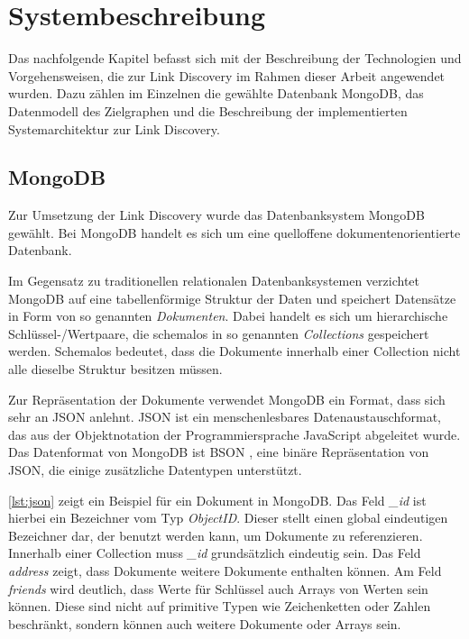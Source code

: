 \chapter{Systembeschreibung}
\label{system}

Das nachfolgende Kapitel befasst sich mit der Beschreibung der Technologien und Vorgehensweisen, die zur Link Discovery im Rahmen dieser Arbeit angewendet wurden. Dazu zählen im Einzelnen die gewählte Datenbank MongoDB, das Datenmodell des Zielgraphen und die Beschreibung der implementierten Systemarchitektur zur Link Discovery.

\section{MongoDB}
\label{mongo}

Zur Umsetzung der Link Discovery wurde das Datenbanksystem MongoDB \cite{mo2013} gewählt. Bei MongoDB handelt es sich um eine quelloffene dokumentenorientierte Datenbank.

Im Gegensatz zu traditionellen relationalen Datenbanksystemen verzichtet MongoDB auf eine tabellenförmige Struktur der Daten und speichert Datensätze in Form von so genannten \emph{Dokumenten}. Dabei handelt es sich um hierarchische Schlüssel-/Wertpaare, die schemalos in so genannten \emph{Collections} gespeichert werden. Schemalos bedeutet, dass die Dokumente innerhalb einer Collection nicht alle dieselbe Struktur besitzen müssen.

Zur Repräsentation der Dokumente verwendet MongoDB ein Format, dass sich sehr an JSON \cite{json2006} anlehnt. JSON ist ein menschenlesbares Datenaustauschformat, das aus der Objektnotation der Programmiersprache JavaScript abgeleitet wurde. Das Datenformat von MongoDB ist BSON \cite{bson2013}, eine binäre Repräsentation von JSON, die einige zusätzliche Datentypen unterstützt. 

\cref{lst:json} zeigt ein Beispiel für ein Dokument in MongoDB. Das Feld \emph{\_id} ist hierbei ein  Bezeichner vom Typ \emph{ObjectID}. Dieser stellt einen global eindeutigen Bezeichner dar, der benutzt werden kann, um Dokumente zu referenzieren. Innerhalb einer Collection muss \emph{\_id} grundsätzlich eindeutig sein. Das Feld \emph{address} zeigt, dass Dokumente weitere Dokumente enthalten können. Am Feld \emph{friends} wird deutlich, dass Werte für Schlüssel auch Arrays von Werten sein können. Diese sind nicht auf primitive Typen wie Zeichenketten oder Zahlen beschränkt, sondern können auch weitere Dokumente oder Arrays sein.

